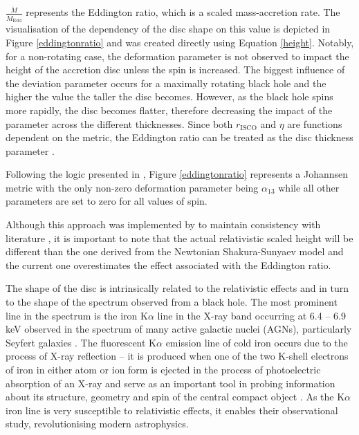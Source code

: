 \documentclass[fleqn,usenatbib,useAMS]{mnras}
\begin{document}
$\frac{\dot{M}}{\dot{M}_\text{Edd}}$ represents the Eddington ratio, which is a scaled mass-accretion rate. The visualisation of the dependency of the disc shape on this value is depicted in Figure \ref{eddingtonratio} and was created directly using Equation \ref{height}. 
Notably, for a non-rotating case, the deformation parameter is not observed to impact the height of the accretion disc unless the spin is increased. The biggest influence of the deviation parameter occurs for a maximally rotating black hole and the higher the value the taller the disc becomes. However, as the black hole spins more rapidly, the disc becomes flatter, therefore decreasing the impact of the parameter across the different thicknesses.
Since both $r_{\text{ISCO}}$ and $\eta$ are functions dependent on the metric, the Eddington ratio can be treated as the disc thickness parameter \citep{abdikamalov2020testing}.

Following the logic presented in \cite{abdikamalov2020testing}, Figure \ref{eddingtonratio} represents a Johannsen metric with the only non-zero deformation parameter being $\alpha_{13}$ while all other parameters are set to zero for all values of spin.

Although this approach was implemented by \cite{abdikamalov2020testing} to maintain consistency with literature \citep{taylor2018exploring}, it is important to note that the actual relativistic scaled height will be different than the one derived from the Newtonian Shakura-Sunyaev model and the current one overestimates the effect associated with the Eddington ratio. 

The shape of the disc is intrinsically related to the relativistic effects and in turn to the shape of the spectrum observed from a black hole. The most prominent line in the spectrum is the iron K$\alpha$ line in the X-ray band occurring at 6.4 -- 6.9 keV observed in the spectrum of many active galactic nuclei (AGNs), particularly Seyfert galaxies \cite{fabian2000broad}. The fluorescent K$\alpha$ emission line of cold iron occurs due to the process of X-ray reflection -- it is produced when one of the two K-shell electrons of iron in either atom or ion form is ejected in the process of photoelectric absorption of an X-ray \cite{fabian2000broad} and serve as an important tool in probing information about its structure, geometry and spin of the central compact object \cite{reynolds1999x}. As the K$\alpha$ iron line is very susceptible to relativistic effects, it enables their observational study, revolutionising modern astrophysics.
\end{document}

